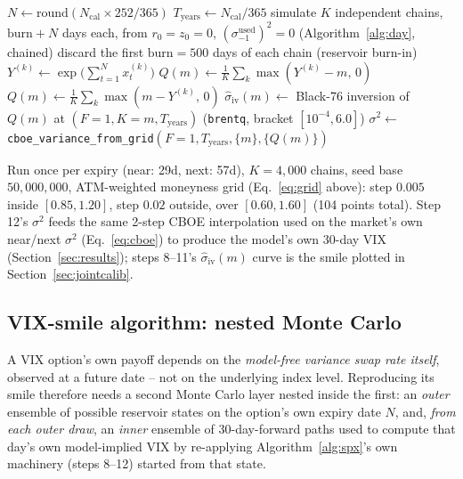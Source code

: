 \documentclass[11pt]{article}
\begin{document}
\begin{algorithm}[H]
\caption{SPX cross-sectional smile at horizon $N_{\text{cal}}$ calendar days}
\label{alg:spx}
\begin{algorithmic}[1]
\State $N \gets \mathrm{round}(N_{\text{cal}}\times252/365)$ 
\State $T_{\text{years}} \gets N_{\text{cal}}/365$
\State simulate $K$ independent chains, $\mathrm{burn}+N$ days each, from $r_0=z_0=0$, $(\sigma^{\text{used}}_{-1})^2=0$ (Algorithm~\ref{alg:day}, chained)
\State discard the first $\mathrm{burn}=500$ days of each chain (reservoir burn-in)
    \State $Y^{(k)} \gets \exp\!\big(\sum_{t=1}^{N} x_t^{(k)}\big)$ 
\EndFor
{}
        \State $Q(m) \gets \frac1K\sum_k \max(Y^{(k)}-m,\,0)$ 
    \Else
        \State $Q(m) \gets \frac1K\sum_k \max(m-Y^{(k)},\,0)$ 
    \EndIf
    \State $\widehat\sigma_{\text{iv}}(m) \gets$ Black-76 inversion of $Q(m)$ at $(F{=}1,K{=}m,T_{\text{years}})$ (\texttt{brentq}, bracket $[10^{-4},6.0]$)
\EndFor
\State $\sigma^2 \gets$ \texttt{cboe\_variance\_from\_grid}$(F{=}1, T_{\text{years}}, \{m\}, \{Q(m)\})$ 
\end{algorithmic}
\end{algorithm}
Run once per expiry (near: 29d, next: 57d), $K=4{,}000$ chains, seed
base $50{,}000{,}000$, ATM-weighted moneyness grid (Eq.~\eqref{eq:grid}
above): step $0.005$ inside $[0.85,1.20]$, step $0.02$ outside, over
$[0.60,1.60]$ (104 points total). Step 12's $\sigma^2$ feeds the same 2-step CBOE
interpolation used on the market's own near/next $\sigma^2$
(Eq.~\eqref{eq:cboe}) to produce the model's own 30-day VIX
(Section~\ref{sec:results}); steps 8--11's $\widehat\sigma_{\text{iv}}(m)$
curve is the smile plotted in Section~\ref{sec:jointcalib}.

\subsection{VIX-smile algorithm: nested Monte Carlo}
\label{sec:vix-algo}
A VIX option's own payoff depends on the \emph{model-free variance
swap rate itself}, observed at a future date -- not on the underlying
index level. Reproducing its smile therefore needs a second Monte
Carlo layer nested inside the first: an \emph{outer} ensemble of
possible reservoir states on the option's own expiry date $N$, and,
\emph{from each outer draw}, an \emph{inner} ensemble of 30-day-forward
paths used to compute that day's own model-implied VIX by re-applying
Algorithm~\ref{alg:spx}'s own machinery (steps 8--12) started from that
state.
\end{document}
